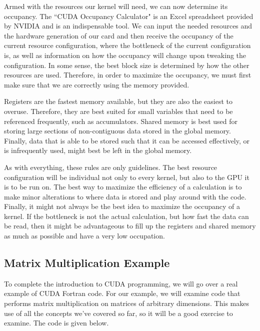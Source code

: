 Armed with the resources our kernel will need, we can now determine its occupancy. The ``CUDA Occupancy Calculator" is an Excel spreadsheet provided by NVIDIA and is an indispensable tool. We can input the needed resources and the hardware generation of our card and then receive the occupancy of the current resource configuration, where the bottleneck of the current configuration is, as well as information on how the occupancy will change upon tweaking the configuration. In some sense, the best block size is determined by how the other resources are used. Therefore, in order to maximize the occupancy, we must first make sure that we are correctly using the memory provided.

Registers are the fastest memory available, but they are also the easiest to overuse. Therefore, they are best suited for small variables that need to be referenced frequently, such as accumulators. Shared memory is best used for storing large sections of non-contiguous data stored in the global memory. Finally, data that is able to be stored such that it can be accessed effectively, or is infrequently used, might best be left in the global memory.

As with everything, these rules are only guidelines. The best resource configuration will be individual not only to every kernel, but also to the GPU it is to be run on. The best way to maximize the efficiency of a calculation is to make minor alterations to where data is stored and play around with the code. Finally, it might not always be the best idea to maximize the occupancy of a kernel. If the bottleneck is not the actual calculation, but how fast the data can be read, then it might be advantageous to fill up the registers and shared memory as much as possible and have a very low occupation.

\subsection{Matrix Multiplication Example}
To complete the introduction to CUDA programming, we will go over a real example of CUDA Fortran code. For our example, we will examine code that performs matrix multiplication on matrices of arbitrary dimensions. This makes use of all the concepts we've covered so far, so it will be a good exercise to examine. The code is given below.


